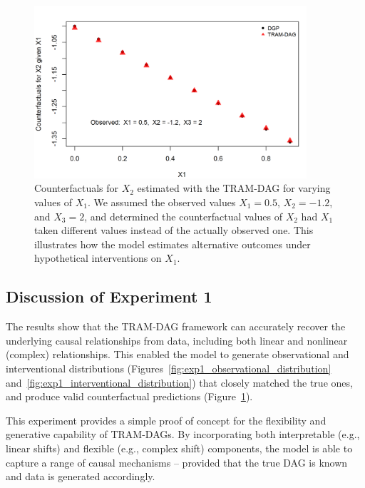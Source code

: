 \begin{figure}[htbp]
\centering
\includegraphics[width=0.9\textwidth]{img/exp1_counterfactuals.png}

\caption{Counterfactuals for $X_2$ estimated with the TRAM-DAG for varying values of $X_1$. We assumed the observed values $X_1 = 0.5$, $X_2 = -1.2$, and $X_3 = 2$, and determined the counterfactual values of $X_2$ had $X_1$ taken different values instead of the actually observed one. This illustrates how the model estimates alternative outcomes under hypothetical interventions on $X_1$.}
\label{fig:exp1_counterfactuals}
\end{figure}



\FloatBarrier

\subsection{Discussion of Experiment 1}

The results show that the TRAM-DAG framework can accurately recover the underlying causal relationships from data, including both linear and nonlinear (complex) relationships. This enabled the model to generate observational and interventional distributions (Figures~\ref{fig:exp1_observational_distribution} and~\ref{fig:exp1_interventional_distribution}) that closely matched the true ones, and produce valid counterfactual predictions (Figure~\ref{fig:exp1_counterfactuals}).

This experiment provides a simple proof of concept for the flexibility and generative capability of TRAM-DAGs. By incorporating both interpretable (e.g., linear shifts) and flexible (e.g., complex shift) components, the model is able to capture a range of causal mechanisms -- provided that the true DAG is known and data is generated accordingly.


